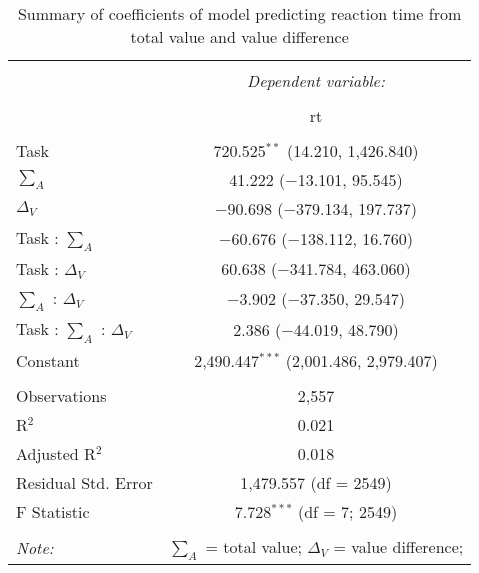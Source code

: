 
\begin{table}[!b] \centering 
  \caption{Summary of coefficients of model predicting reaction time from total value and value difference} 
  \label{table:rtModelSmithTask} 
\begin{tabular}{@{\extracolsep{5pt}}lc} 
\\[-1.8ex]\hline 
\hline \\[-1.8ex] 
 & \multicolumn{1}{c}{\textit{Dependent variable:}} \\ 
\cline{2-2} 
\\[-1.8ex] & rt \\ 
\hline \\[-1.8ex] 
 Task & 720.525$^{**}$ (14.210, 1,426.840) \\ 
  $\sum_A$ & 41.222 ($-$13.101, 95.545) \\ 
  $\Delta_V$ & $-$90.698 ($-$379.134, 197.737) \\ 
  Task : $\sum_A$ & $-$60.676 ($-$138.112, 16.760) \\ 
  Task : $\Delta_V$ & 60.638 ($-$341.784, 463.060) \\ 
  $\sum_A$ : $\Delta_V$ & $-$3.902 ($-$37.350, 29.547) \\ 
  Task : $\sum_A$ :  $\Delta_V$ & 2.386 ($-$44.019, 48.790) \\ 
  Constant & 2,490.447$^{***}$ (2,001.486, 2,979.407) \\ 
 \hline \\[-1.8ex] 
Observations & 2,557 \\ 
R$^{2}$ & 0.021 \\ 
Adjusted R$^{2}$ & 0.018 \\ 
Residual Std. Error & 1,479.557 (df = 2549) \\ 
F Statistic & 7.728$^{***}$ (df = 7; 2549) \\ 
\hline 
\hline \\[-1.8ex] 
\textit{Note:}  & \multicolumn{1}{l}{\footnotesize $\sum_A$ = total value; $\Delta_V$ = value difference; } \\ 
\end{tabular} 
\end{table} 
